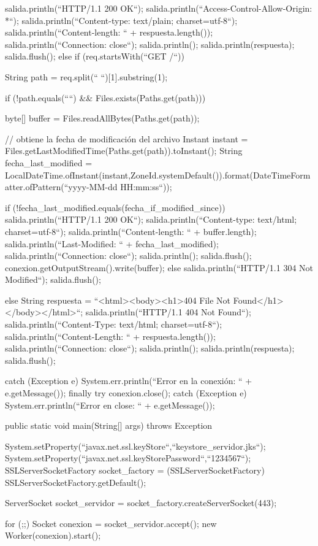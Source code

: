 \documentclass[11pt,a4paper,oneside]{book}
\begin{document}
\begin{SourceCode}
{{{{{          salida.println(``HTTP/1.1 200 OK``);
          salida.println(``Access-Control-Allow-Origin: *``);
          salida.println(``Content-type: text/plain; charset=utf-8``);
          salida.println(``Content-length: `` + respuesta.length());
          salida.println(``Connection: close``);
          salida.println();
          salida.println(respuesta);
          salida.flush();
        }
        else
        if (req.startsWith(``GET /``))
        {
          String path = req.split(`` ``)[1].substring(1);

          if (!path.equals(````) && Files.exists(Paths.get(path)))
          {
            byte[] buffer = Files.readAllBytes(Paths.get(path));

            // obtiene la fecha de modificación del archivo
            Instant instant = Files.getLastModifiedTime(Paths.get(path)).toInstant();
            String fecha_last_modified = LocalDateTime.ofInstant(instant,ZoneId.systemDefault()).format(DateTimeFormatter.ofPattern(``yyyy-MM-dd HH:mm:ss``));

            if (!fecha_last_modified.equals(fecha_if_modified_since))
            {
              salida.println(``HTTP/1.1 200 OK``);
              salida.println(``Content-type: text/html; charset=utf-8``);
              salida.println(``Content-length: `` + buffer.length);
              salida.println(``Last-Modified: `` + fecha_last_modified);
              salida.println(``Connection: close``);
              salida.println();
              salida.flush();
	            conexion.getOutputStream().write(buffer);
            }
            else
            {
              salida.println(``HTTP/1.1 304 Not Modified``);
              salida.flush();
            }
          }
          else
          {
            String respuesta = ``<html><body><h1>404 File Not Found</h1></body></html>``;
            salida.println(``HTTP/1.1 404 Not Found``);
            salida.println(``Content-Type: text/html; charset=utf-8``);
            salida.println(``Content-Length: `` + respuesta.length());
            salida.println(``Connection: close``);
            salida.println();
            salida.println(respuesta);
            salida.flush();
          }
        }
      }
      catch (Exception e)
      {
        System.err.println(``Error en la conexión: `` + e.getMessage());
      }
      finally
      {
        try
        {
          conexion.close();
        }
        catch (Exception e)
        {
          System.err.println(``Error en close: `` + e.getMessage());
        }
      }
    }
  }

  public static void main(String[] args) throws Exception
  {
    System.setProperty(``javax.net.ssl.keyStore``,``keystore_servidor.jks``);
    System.setProperty(``javax.net.ssl.keyStorePassword``,``1234567``);
    SSLServerSocketFactory socket_factory = (SSLServerSocketFactory) SSLServerSocketFactory.getDefault();

    ServerSocket socket_servidor = socket_factory.createServerSocket(443);

    for (;;)
    {
      Socket conexion = socket_servidor.accept();
      new Worker(conexion).start();
    }
  }
}
\end{SourceCode}
\end{document}

